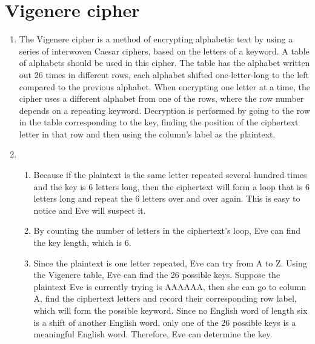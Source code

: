 \documentclass[a4paper]{article}
\begin{document}
\begin{enumerate}
\end{enumerate}

\section{Vigenere cipher}
\begin{enumerate}
\item
The Vigenere cipher is a method of encrypting alphabetic text by using a series of interwoven Caesar ciphers, based on the letters of a keyword. A table of alphabets should be used in this cipher. The table has the alphabet written out 26 times in different rows, each alphabet shifted one-letter-long to the left compared to the previous alphabet. When encrypting one letter at a time, the cipher uses a different alphabet from one of the rows, where the row number depends on a repeating keyword. Decryption is performed by going to the row in the table corresponding to the key, finding the position of the ciphertext letter in that row and then using the column's label as the plaintext.
\item
\begin{enumerate}
\item
Because if the plaintext is the same letter repeated several hundred times and the key is 6 letters long, then the ciphertext will form a loop that is 6 letters long and repeat the 6 letters over and over again. This is easy to notice and Eve will suspect it.
\item
By counting the number of letters in the ciphertext's loop, Eve can find the key length, which is 6.
\item
Since the plaintext is one letter repeated, Eve can try from A to Z. Using the Vigenere table, Eve can find the 26 possible keys. Suppose the plaintext Eve is currently trying is AAAAAA, then she can go to column A, find the ciphertext letters and record their corresponding row label, which will form the possible keyword. Since no English word of length six is a shift of another English word, only one of the 26 possible keys is a meaningful English word. Therefore, Eve can determine the key.
\end{enumerate}
\end{enumerate}
\end{document}

